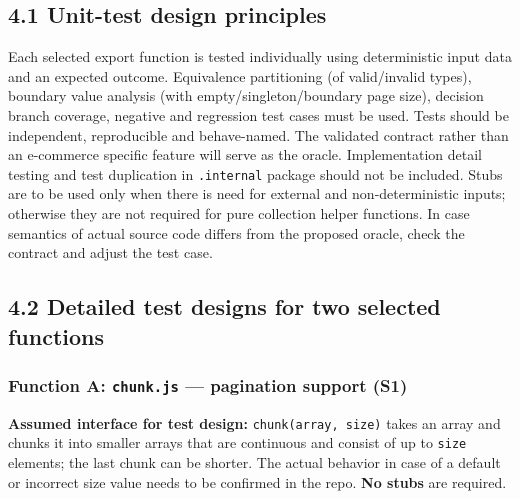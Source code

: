 \documentclass[
  9pt,
]{article}
\begin{document}
\subsection{4.1 Unit-test design
principles}\label{unit-test-design-principles}

Each selected export function is tested individually using deterministic
input data and an expected outcome. Equivalence partitioning (of
valid/invalid types), boundary value analysis (with
empty/singleton/boundary page size), decision branch coverage, negative
and regression test cases must be used. Tests should be independent,
reproducible and behave-named. The validated contract rather than an
e-commerce specific feature will serve as the oracle. Implementation
detail testing and test duplication in \texttt{.internal} package should
not be included. Stubs are to be used only when there is need for
external and non-deterministic inputs; otherwise they are not required
for pure collection helper functions. In case semantics of actual source
code differs from the proposed oracle, check the contract and adjust the
test case.

\subsection{4.2 Detailed test designs for two selected
functions}\label{detailed-test-designs-for-two-selected-functions}

\subsubsection{\texorpdfstring{Function A: \texttt{chunk.js} ---
pagination support
(S1)}{Function A: chunk.js --- pagination support (S1)}}\label{function-a-chunk.js-pagination-support-s1}

\textbf{Assumed interface for test design:} \texttt{chunk(array,\ size)}
takes an array and chunks it into smaller arrays that are continuous and
consist of up to \texttt{size} elements; the last chunk can be shorter.
The actual behavior in case of a default or incorrect size value needs
to be confirmed in the repo. \textbf{No stubs} are required.
\end{document}
